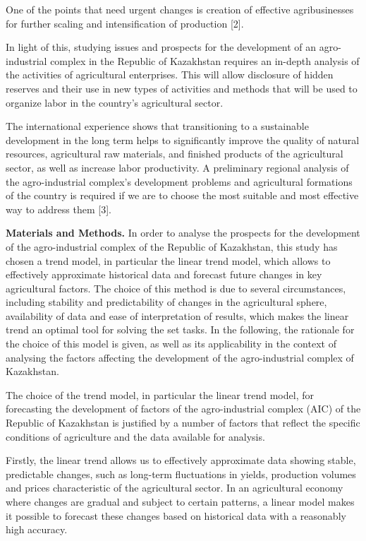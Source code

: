 One of the points that need urgent changes is creation of effective
agribusinesses for further scaling and intensification of production
{[}2{]}.

In light of this, studying issues and prospects for the development of
an agro-industrial complex in the Republic of Kazakhstan requires an
in-depth analysis of the activities of agricultural enterprises. This
will allow disclosure of hidden reserves and their use in new types of
activities and methods that will be used to organize labor in the
country's agricultural sector.

The international experience shows that transitioning to a sustainable
development in the long term helps to significantly improve the quality
of natural resources, agricultural raw materials, and finished products
of the agricultural sector, as well as increase labor productivity. A
preliminary regional analysis of the agro-industrial complex's
development problems and agricultural formations of the country is
required if we are to choose the most suitable and most effective way to
address them {[}3{]}.

{\bfseries Materials and Methods.} In order to analyse the prospects for
the development of the agro-industrial complex of the Republic of
Kazakhstan, this study has chosen a trend model, in particular the
linear trend model, which allows to effectively approximate historical
data and forecast future changes in key agricultural factors. The choice
of this method is due to several circumstances, including stability and
predictability of changes in the agricultural sphere, availability of
data and ease of interpretation of results, which makes the linear trend
an optimal tool for solving the set tasks. In the following, the
rationale for the choice of this model is given, as well as its
applicability in the context of analysing the factors affecting the
development of the agro-industrial complex of Kazakhstan.

The choice of the trend model, in particular the linear trend model, for
forecasting the development of factors of the agro-industrial complex
(AIC) of the Republic of Kazakhstan is justified by a number of factors
that reflect the specific conditions of agriculture and the data
available for analysis.

Firstly, the linear trend allows us to effectively approximate data
showing stable, predictable changes, such as long-term fluctuations in
yields, production volumes and prices characteristic of the agricultural
sector. In an agricultural economy where changes are gradual and subject
to certain patterns, a linear model makes it possible to forecast these
changes based on historical data with a reasonably high accuracy.

